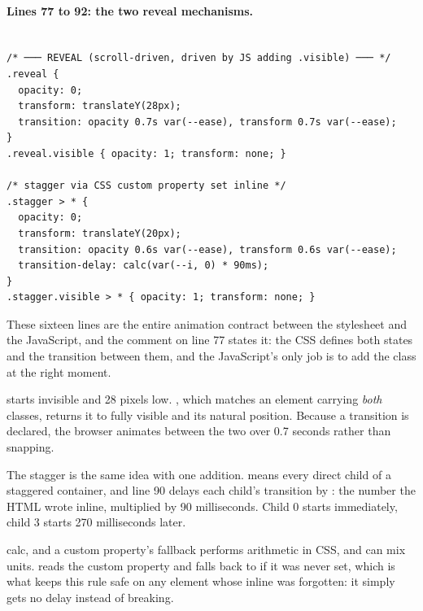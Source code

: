 \paragraph{Lines 77 to 92: the two reveal mechanisms.}

\begin{lstlisting}[firstnumber=76,caption={\file{css/site.css}, lines 76--92}]

/* ─── REVEAL (scroll-driven, driven by JS adding .visible) ─── */
.reveal {
  opacity: 0;
  transform: translateY(28px);
  transition: opacity 0.7s var(--ease), transform 0.7s var(--ease);
}
.reveal.visible { opacity: 1; transform: none; }

/* stagger via CSS custom property set inline */
.stagger > * {
  opacity: 0;
  transform: translateY(20px);
  transition: opacity 0.6s var(--ease), transform 0.6s var(--ease);
  transition-delay: calc(var(--i, 0) * 90ms);
}
.stagger.visible > * { opacity: 1; transform: none; }
\end{lstlisting}

These sixteen lines are the entire animation contract between the stylesheet and
the JavaScript, and the comment on line 77 states it: the CSS defines both states
and the transition between them, and the JavaScript's only job is to add the class
 at the right moment.

 starts invisible and 28 pixels low. , which
matches an element carrying \emph{both} classes, returns it to fully visible and
its natural position. Because a transition is declared, the browser animates
between the two over 0.7 seconds rather than snapping.

The stagger is the same idea with one addition.  means every
direct child of a staggered container, and line 90 delays each child's transition
by : the number the HTML wrote inline, multiplied by
90 milliseconds. Child 0 starts immediately, child 3 starts 270 milliseconds later.

\begin{jargon}{calc, and a custom property's fallback}
 performs arithmetic in CSS, and can mix units.
 reads the custom property  and falls back to
 if it was never set, which is what keeps this rule safe on any element
whose inline  was forgotten: it simply gets no delay instead of breaking.
\end{jargon}

